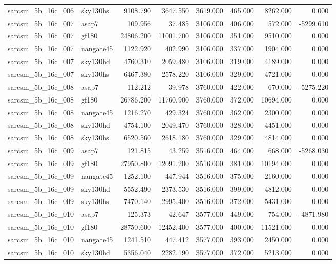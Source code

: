 \begin{tabular}{llrrrrrr}
sarcsm\_5b\_16c\_006 & sky130hs & 9108.790 & 3647.550 & 3619.000 & 465.000 & 8262.000 & 0.000 \\
sarcsm\_5b\_16c\_007 & asap7 & 109.956 & 37.485 & 3106.000 & 406.000 & 572.000 & -5299.610 \\
sarcsm\_5b\_16c\_007 & gf180 & 24806.200 & 11001.700 & 3106.000 & 351.000 & 9510.000 & 0.000 \\
sarcsm\_5b\_16c\_007 & nangate45 & 1122.920 & 402.990 & 3106.000 & 337.000 & 1904.000 & 0.000 \\
sarcsm\_5b\_16c\_007 & sky130hd & 4760.310 & 2059.480 & 3106.000 & 319.000 & 4189.000 & 0.000 \\
sarcsm\_5b\_16c\_007 & sky130hs & 6467.380 & 2578.220 & 3106.000 & 329.000 & 4721.000 & 0.000 \\
sarcsm\_5b\_16c\_008 & asap7 & 112.212 & 39.978 & 3760.000 & 422.000 & 670.000 & -5275.220 \\
sarcsm\_5b\_16c\_008 & gf180 & 26786.200 & 11760.900 & 3760.000 & 372.000 & 10694.000 & 0.000 \\
sarcsm\_5b\_16c\_008 & nangate45 & 1216.270 & 429.324 & 3760.000 & 362.000 & 2300.000 & 0.000 \\
sarcsm\_5b\_16c\_008 & sky130hd & 4754.100 & 2049.470 & 3760.000 & 328.000 & 4451.000 & 0.000 \\
sarcsm\_5b\_16c\_008 & sky130hs & 6520.560 & 2618.180 & 3760.000 & 329.000 & 4814.000 & 0.000 \\
sarcsm\_5b\_16c\_009 & asap7 & 121.815 & 43.259 & 3516.000 & 464.000 & 668.000 & -5268.030 \\
sarcsm\_5b\_16c\_009 & gf180 & 27950.800 & 12091.200 & 3516.000 & 381.000 & 10194.000 & 0.000 \\
sarcsm\_5b\_16c\_009 & nangate45 & 1252.100 & 447.944 & 3516.000 & 375.000 & 2160.000 & 0.000 \\
sarcsm\_5b\_16c\_009 & sky130hd & 5552.490 & 2373.530 & 3516.000 & 399.000 & 4812.000 & 0.000 \\
sarcsm\_5b\_16c\_009 & sky130hs & 7470.140 & 2995.400 & 3516.000 & 372.000 & 5431.000 & 0.000 \\
sarcsm\_5b\_16c\_010 & asap7 & 125.373 & 42.647 & 3577.000 & 449.000 & 754.000 & -4871.980 \\
sarcsm\_5b\_16c\_010 & gf180 & 28750.600 & 12452.400 & 3577.000 & 400.000 & 11521.000 & 0.000 \\
sarcsm\_5b\_16c\_010 & nangate45 & 1241.510 & 447.412 & 3577.000 & 393.000 & 2450.000 & 0.000 \\
sarcsm\_5b\_16c\_010 & sky130hd & 5356.040 & 2282.190 & 3577.000 & 372.000 & 5213.000 & 0.000 \\

\end{tabular}
